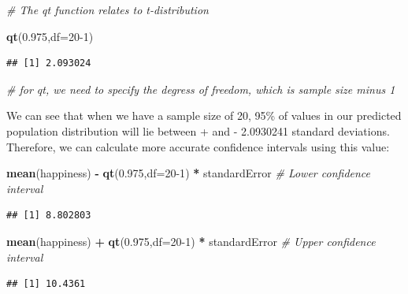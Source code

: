 \documentclass[
]{book}
\newenvironment{Shaded}{\begin{snugshade}}{\end{snugshade}}
\newcommand{\CommentTok}[1]{\textcolor[rgb]{0.56,0.35,0.01}{\textit{#1}}}
\newcommand{\DataTypeTok}[1]{\textcolor[rgb]{0.13,0.29,0.53}{#1}}
\newcommand{\DecValTok}[1]{\textcolor[rgb]{0.00,0.00,0.81}{#1}}
\newcommand{\FloatTok}[1]{\textcolor[rgb]{0.00,0.00,0.81}{#1}}
\newcommand{\KeywordTok}[1]{\textcolor[rgb]{0.13,0.29,0.53}{\textbf{#1}}}
\newcommand{\NormalTok}[1]{#1}
\newcommand{\OperatorTok}[1]{\textcolor[rgb]{0.81,0.36,0.00}{\textbf{#1}}}
\newcommand{\StringTok}[1]{\textcolor[rgb]{0.31,0.60,0.02}{#1}}
\begin{document}
\begin{Shaded}
\begin{Highlighting}[]
\CommentTok{# The qt function relates to t-distribution}

\KeywordTok{qt}\NormalTok{(}\FloatTok{0.975}\NormalTok{,}\DataTypeTok{df=}\DecValTok{20-1}\NormalTok{)}
\end{Highlighting}
\end{Shaded}

\begin{verbatim}
## [1] 2.093024
\end{verbatim}

\begin{Shaded}
\begin{Highlighting}[]
\CommentTok{# for qt, we need to specify the degress of freedom, which is sample size minus 1}
\end{Highlighting}
\end{Shaded}

We can see that when we have a sample size of 20, 95\% of values in our predicted population distribution will lie between + and - 2.0930241 standard deviations. Therefore, we can calculate more accurate confidence intervals using this value:

\begin{Shaded}
\begin{Highlighting}[]
\KeywordTok{mean}\NormalTok{(happiness) }\OperatorTok{-}\StringTok{ }\KeywordTok{qt}\NormalTok{(}\FloatTok{0.975}\NormalTok{,}\DataTypeTok{df=}\DecValTok{20-1}\NormalTok{) }\OperatorTok{*}\StringTok{ }\NormalTok{standardError }\CommentTok{# Lower confidence interval}
\end{Highlighting}
\end{Shaded}

\begin{verbatim}
## [1] 8.802803
\end{verbatim}

\begin{Shaded}
\begin{Highlighting}[]
\KeywordTok{mean}\NormalTok{(happiness) }\OperatorTok{+}\StringTok{ }\KeywordTok{qt}\NormalTok{(}\FloatTok{0.975}\NormalTok{,}\DataTypeTok{df=}\DecValTok{20-1}\NormalTok{) }\OperatorTok{*}\StringTok{ }\NormalTok{standardError }\CommentTok{# Upper confidence interval}
\end{Highlighting}
\end{Shaded}

\begin{verbatim}
## [1] 10.4361
\end{verbatim}
\end{document}

